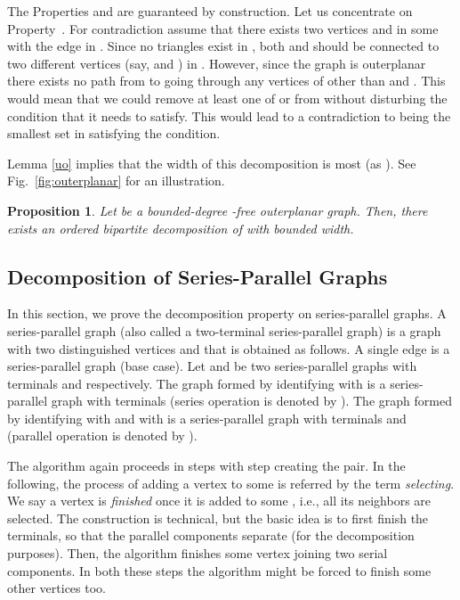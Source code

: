 \documentclass[11pt]{article}
\newtheorem{proposition}[theorem]{Proposition}
\newcommand{\FI}[1]{Fig.\ \ref{#1}}
\begin{document}
The Properties  and  are guaranteed  by construction. Let us concentrate on Property~. For contradiction assume that there exists two vertices  and  in some  with the edge  in . Since no triangles exist in , both  and  should be connected to two different vertices (say,  and ) in . However, since the graph is outerplanar there exists no path from  to  going through any vertices of  other than  and . This would mean that we could remove at least one of  or  from  without disturbing the condition that it needs to satisfy. This would lead to a contradiction to   being the smallest set in  satisfying the condition.


Lemma \ref{uo} implies that the width of this decomposition is most  (as ). See \FI{fig:outerplanar} for an illustration.

\begin{proposition} \label{prop:3}
Let  be a bounded-degree -free outerplanar graph. Then, there exists an ordered bipartite decomposition of  with bounded width.
\end{proposition}

\subsection{Decomposition of Series-Parallel Graphs}
In this section, we prove the decomposition property on series-parallel graphs. A series-parallel graph (also called a two-terminal series-parallel graph)  is a graph with two distinguished vertices  and  that is obtained as follows. A single edge  is a  series-parallel graph (base case).  Let  and  be two series-parallel graphs with terminals   and  respectively. The graph formed by identifying  with  is a series-parallel graph with terminals  (series operation is denoted by ). The graph formed by identifying  with  and  with  is a series-parallel graph with terminals  and  (parallel operation is denoted by ). 

The algorithm again proceeds in steps with step  creating the  pair. In the following, the process of adding a vertex to some  is referred by the term {\em selecting}. We say a vertex is {\em finished} once it is added to some , i.e., all its neighbors are selected. The construction is technical, but the basic idea is to first finish the terminals, so that the parallel components separate (for the decomposition purposes). Then, the algorithm finishes some vertex joining two serial components. In both these steps the algorithm might be forced to finish some other vertices too. 
\end{document}
